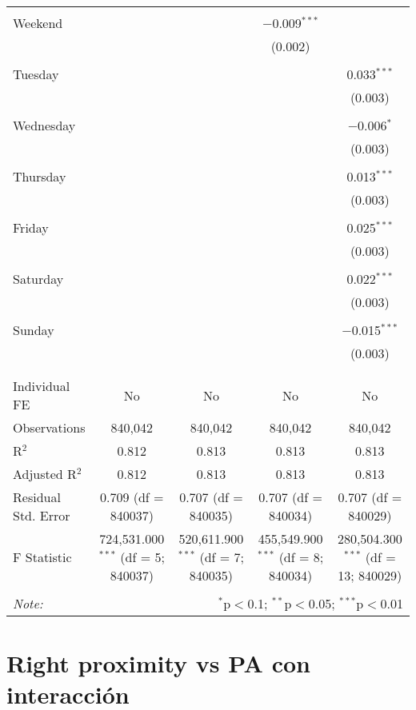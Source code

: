 \documentclass[
]{article}
\begin{document}
\begin{table}[!htbp]
{\begin{tabular}{@{\extracolsep{5pt}}lcccc}
  & & & & \\ 
 Weekend &  &  & $-$0.009$^{***}$ &  \\ 
  &  &  & (0.002) &  \\ 
  & & & & \\ 
 Tuesday &  &  &  & 0.033$^{***}$ \\ 
  &  &  &  & (0.003) \\ 
  & & & & \\ 
 Wednesday &  &  &  & $-$0.006$^{*}$ \\ 
  &  &  &  & (0.003) \\ 
  & & & & \\ 
 Thursday &  &  &  & 0.013$^{***}$ \\ 
  &  &  &  & (0.003) \\ 
  & & & & \\ 
 Friday &  &  &  & 0.025$^{***}$ \\ 
  &  &  &  & (0.003) \\ 
  & & & & \\ 
 Saturday &  &  &  & 0.022$^{***}$ \\ 
  &  &  &  & (0.003) \\ 
  & & & & \\ 
 Sunday &  &  &  & $-$0.015$^{***}$ \\ 
  &  &  &  & (0.003) \\ 
  & & & & \\ 
\hline \\[-1.8ex] 
Individual FE & No & No & No & No \\ 
Observations & 840,042 & 840,042 & 840,042 & 840,042 \\ 
R$^{2}$ & 0.812 & 0.813 & 0.813 & 0.813 \\ 
Adjusted R$^{2}$ & 0.812 & 0.813 & 0.813 & 0.813 \\ 
Residual Std. Error & 0.709 (df = 840037) & 0.707 (df = 840035) & 0.707 (df = 840034) & 0.707 (df = 840029) \\ 
F Statistic & 724,531.000$^{***}$ (df = 5; 840037) & 520,611.900$^{***}$ (df = 7; 840035) & 455,549.900$^{***}$ (df = 8; 840034) & 280,504.300$^{***}$ (df = 13; 840029) \\ 
\hline 
\hline \\[-1.8ex] 
\textit{Note:}  & \multicolumn{4}{r}{$^{*}$p$<$0.1; $^{**}$p$<$0.05; $^{***}$p$<$0.01} \\ 
\end{tabular}
} 
\end{table} 
\newpage
\section{Right proximity vs PA con interacción}
\end{document}
